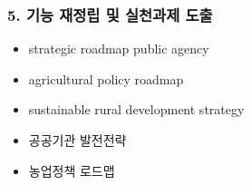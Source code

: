 \subsubsection*{5. 기능 재정립 및 실천과제 도출}

\begin{itemize}
    \item strategic roadmap public agency
    \item agricultural policy roadmap
    \item sustainable rural development strategy
    \item 공공기관 발전전략
    \item 농업정책 로드맵
\end{itemize}